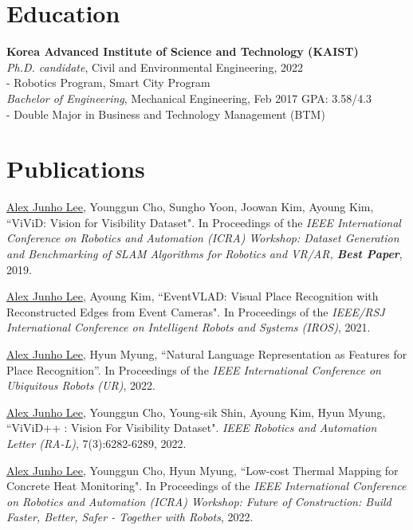 \documentclass[margin]{res}
\begin{document}
	\begin{resume}
		
		\section{Education}
		\textbf{Korea Advanced Institute of Science and Technology (KAIST)}\\
		{\sl Ph.D. candidate}, Civil and Environmental Engineering, 2022
		\\- Robotics Program, Smart City Program
		\\
		{\sl Bachelor of Engineering}, Mechanical Engineering, Feb 2017
		\hfill GPA: 3.58/4.3
		\\- Double Major in Business and Technology Management (BTM)
		\section{Publications}
		
		\par\underline{Alex Junho Lee}, Younggun Cho, Sungho Yoon, Joowan Kim, Ayoung Kim, ``ViViD: Vision for Visibility Dataset". In Proceedings of the \textit{IEEE International Conference on Robotics and Automation (ICRA) Workshop: Dataset Generation and Benchmarking of SLAM Algorithms for Robotics and VR/AR, \textbf{Best Paper}}, 2019.
			
		\par\underline{Alex Junho Lee}, Ayoung Kim, ``EventVLAD: Visual Place Recognition with Reconstructed Edges from Event Cameras". In Proceedings of the \textit{IEEE/RSJ International Conference on Intelligent Robots and Systems (IROS)}, 2021.
			
		\par\underline{Alex Junho Lee}, Hyun Myung, ``Natural Language Representation as Features for Place Recognition''. In Proceedings of the \textit{IEEE International Conference on Ubiquitous Robots (UR)}, 2022.
			
		\par\underline{Alex Junho Lee}, Younggun Cho, Young-sik Shin, Ayoung Kim, Hyun Myung, ``ViViD++ : Vision For Visibility Dataset". \textit{IEEE Robotics and Automation Letter (RA-L)}, 7(3):6282-6289, 2022.
			
		\par\underline{Alex Junho Lee}, Younggun Cho, Hyun Myung, ``Low-cost Thermal Mapping for Concrete Heat Monitoring". In Proceedings of the \textit{IEEE International Conference on Robotics and Automation (ICRA) Workshop: Future of Construction: Build Faster, Better, Safer - Together with Robots}, 2022.
			

\end{resume}
\end{document}
